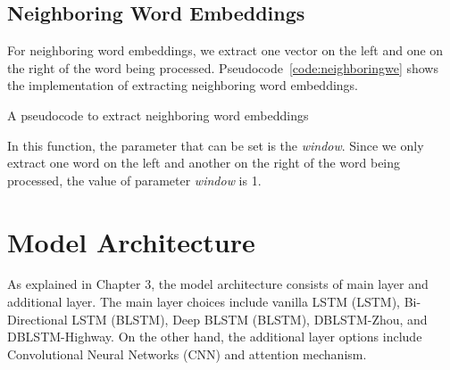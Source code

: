 \subsection{Neighboring Word Embeddings}
For neighboring word embeddings, we extract one vector on the left and one on the right of the word being processed. Pseudocode~\ref{code:neighboringwe} shows the implementation of extracting neighboring word embeddings.

\begin{kode}	
	
	\SetAlgoLined
	\caption{A pseudocode to extract neighboring word embeddings}
	\label{code:neighboringwe}	
\end{kode}

In this function, the parameter that can be set is the \textit{window}. Since we only extract one word on the left and another on the right of the word being processed, the value of parameter \textit{window} is 1.

\section{Model Architecture}
As explained in Chapter 3, the model architecture consists of main layer and additional layer. The main layer choices include vanilla LSTM (LSTM), Bi-Directional LSTM (BLSTM), Deep BLSTM (BLSTM), DBLSTM-Zhou, and DBLSTM-Highway. On the other hand, the additional layer options include Convolutional Neural Networks (CNN) and attention mechanism. 

